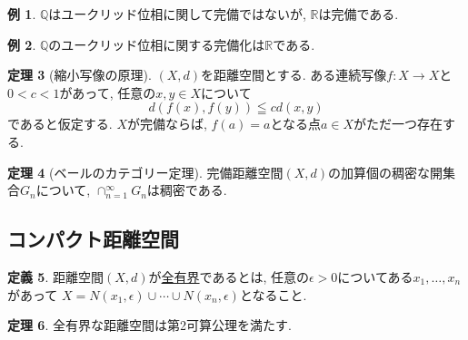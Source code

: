 \documentclass[dvipdfmx,a4paper,11pt]{article}
\newcommand{\R}{\mathbb{R}}
\newcommand{\Q}{\mathbb{Q}}
\theoremstyle{definition}
\newtheorem{thm}{定理}
\newtheorem{dfn}[thm]{定義}
\newtheorem{exa}[thm]{例}
\begin{document}
\begin{exa}
$\Q$はユークリッド位相に関して完備ではないが, $\R$は完備である.
\end{exa}
\begin{exa}
$\Q$のユークリッド位相に関する完備化は$\R$である.
\end{exa}

 \begin{tcolorbox}[
    colback = white,
    colframe = green!35!black,
    fonttitle = \bfseries,
    breakable = true]
    \begin{thm}[縮小写像の原理]
$(X,d)$を距離空間とする.
ある連続写像$f : X \rightarrow X$と$0<c<1$があって, 任意の$x,y \in X$について
$$
d(f(x),f(y)) \leqq cd(x,y)
$$
であると仮定する. $X$が完備ならば, $f(a)=a$となる点$a \in X$がただ一つ存在する.
  \end{thm}
\end{tcolorbox}


 \begin{tcolorbox}[
    colback = white,
    colframe = green!35!black,
    fonttitle = \bfseries,
    breakable = true]
    \begin{thm}[ベールのカテゴリー定理]
完備距離空間$(X,d)$の加算個の稠密な開集合$G_n$について, $\cap_{n=1}^{\infty}G_n$は稠密である.　
  \end{thm}
\end{tcolorbox}



\subsection{コンパクト距離空間}
    \begin{tcolorbox}[
    colback = white,
    colframe = green!35!black,
    fonttitle = \bfseries,
    breakable = true]
    \begin{dfn}
距離空間$(X,d)$が\underline{全有界}であるとは, 任意の$\epsilon>0$についてある$x_1, \ldots, x_n$があって
$
X = N(x_1,\epsilon) \cup \cdots \cup  N(x_n,\epsilon) \text{となること.}
$
  \end{dfn}
 \end{tcolorbox}
 
   \begin{tcolorbox}[
    colback = white,
    colframe = green!35!black,
    fonttitle = \bfseries,
    breakable = true]
    \begin{thm}
全有界な距離空間は第2可算公理を満たす.
  \end{thm}
  \end{tcolorbox}
  
\end{document}
